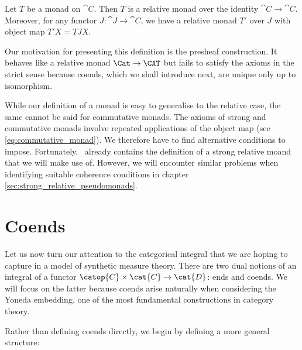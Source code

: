 \begin{example}
  Let $T$ be a monad on $\cat{C}$. Then $T$ is a relative monad over the identity
  $\cat{C}\to\cat{C}$. Moreover, for any functor $J:\cat{J}\to\cat{C}$, we have a
  relative monad $T'$ over $J$ with object map $T'X = TJX$.
\end{example}

Our motivation for presenting this definition is the presheaf construction. It
behaves like a relative monad $\Cat\to\CAT$ but fails to satisfy the axioms in
the strict sense because coends, which we shall introduce next, are unique only
up to isomorphism.

While our definition of a monad is easy to generalise to the relative case, the
same cannot be said for commutative monads. The axioms of strong and
commutative monads involve repeated applications of the object map (see
\ref{eq:commutative_monad}). We therefore have to find alternative conditions
to impose. Fortunately,~\cite{tarmo} already contains the definition of a
strong relative moand that we will make use of. However, we will encounter
similar problems when identifying suitable coherence conditions in chapter~
\ref{sec:strong_relative_pseudomonads}.

\section{Coends}\label{sec:coends}

Let us now turn our attention to the categorical integral that we are hoping to
capture in a model of synthetic measure theory. There are two dual notions of an
integral of a functor $\catop{C}\times\cat{C}\to\cat{D}$: ends and coends. We will
focus on the latter because coends arise naturally when considering the Yoneda
embedding, one of the most fundamental constructions in category theory.

Rather than defining coends directly, we begin by defining a more general
structure:

